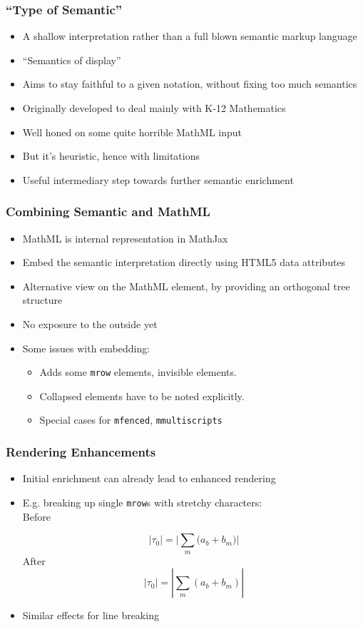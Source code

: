 \documentclass{beamer}
\begin{document}
\begin{frame}
  \frametitle{``Type of Semantic''}
  \begin{itemize}
  \item A shallow interpretation rather than a full blown semantic markup
    language
  \item ``Semantics of display''
  \item Aims to stay faithful to a given notation, without fixing too much
    semantics
  \item Originally developed to deal mainly with K-12 Mathematics
  \item Well honed on some quite horrible MathML input
  \item But it's heuristic, hence with limitations
  \item Useful intermediary step towards further semantic enrichment
  \end{itemize}
\end{frame}


\begin{frame}
  \frametitle{Combining Semantic and MathML}
  \begin{itemize}
  \item MathML is internal representation in MathJax
  \item Embed the semantic interpretation directly using HTML5 data attributes
  \item Alternative view on the MathML element, by providing an orthogonal tree
    structure
  \item No exposure to the outside yet
  \item Some issues with embedding:
    \begin{itemize}
    \item Adds some \texttt{mrow} elements, invisible elements.
    \item Collapsed elements have to be noted explicitly.
    \item Special cases for \texttt{mfenced}, \texttt{mmultiscripts}
    \end{itemize}
  \end{itemize}
\end{frame}


\begin{frame}
  \frametitle{Rendering Enhancements}
  \begin{itemize}
  \item Initial enrichment can already lead to enhanced rendering
  \item E.g. breaking up single \texttt{mrow}s with stretchy characters:\\
    Before

    \[ 
      \biggl\vert \tau_0 \biggr\vert = \biggl\vert  \sum_{m} \bigg(a_b + b_m\bigg) 
      \bigg\vert 
    \]
    After
    \[ 
      \left\vert  \tau_0 \right\vert = \left \vert \sum_{m} \left(a_b + b_m\right) 
      \right\vert 
    \]
  \item Similar effects for line breaking
  \end{itemize}
\end{frame}
\end{document}
